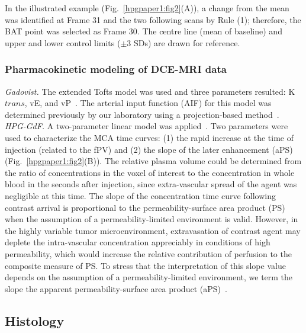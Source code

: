 In the illustrated example (Fig.~\ref{hpgpaper1:fig2}(A)), a change from the mean was identified at Frame 31 and the two following scans by Rule (1); therefore, the BAT point was selected as Frame 30.
The centre line (mean of baseline) and upper and lower control limits ($\pm$3 SDs) are drawn for reference.

\subsubsection{Pharmacokinetic modeling of DCE-MRI data}

\textit{Gadovist.} The extended Tofts model was used and three parameters resulted: K${trans}$, vE, and vP~\cite{Sourbron:2011ce}.
The arterial input function (AIF) for this model was determined previously by our laboratory using a projection-based method~\cite{Moroz:2013ee}.
\textit{HPG-GdF.} A two-parameter linear model was applied~\cite{Pathak:2005gu}.
Two parameters were used to characterize the MCA time curves: (1) the rapid increase at the time of injection (related to the fPV) and (2) the slope of the later enhancement (aPS) (Fig.~\ref{hpgpaper1:fig2}(B)).
The relative plasma volume could be determined from the ratio of concentrations in the voxel of interest to the concentration in whole blood in the seconds after injection, since extra-vascular spread of the agent was negligible at this time.
The slope of the concentration time curve following contrast arrival is proportional to the permeability-surface area product (PS) when the assumption of a permeability-limited environment is valid.
However, in the highly variable tumor microenvironment, extravasation of contrast agent may deplete the intra-vascular concentration appreciably in conditions of high permeability, which would increase the relative contribution of perfusion to the composite measure of PS.
To stress that the interpretation of this slope value depends on the assumption of a permeability-limited environment, we term the slope the apparent permeability-surface area product (aPS)~\cite{DaldrupLink:2004gy,Dafni:2002kb}.

\subsection{Histology}

